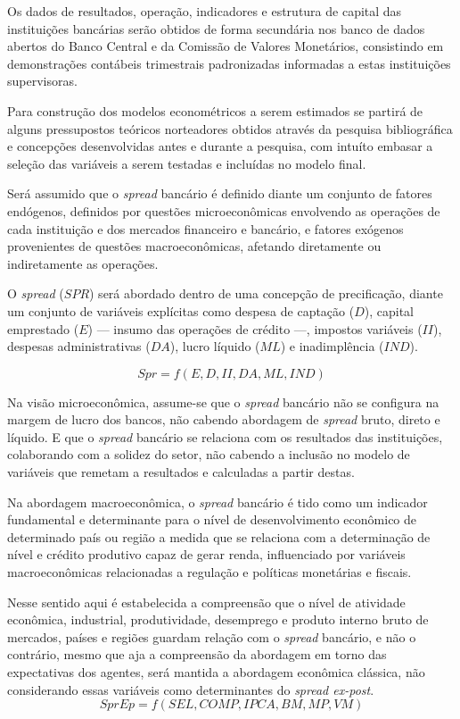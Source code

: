 \documentclass[12pt,12pt,openright,oneside,a4paper,chapter=TITLE,section=TITLE,subsection=TITLE,subsubsection=TITLE,english,french,spanish,portugues,sumario=tradicional]{abntex2}
\begin{document}
Os dados de resultados, operação, indicadores e estrutura de capital das instituições bancárias serão obtidos de forma secundária nos banco de dados abertos do Banco Central e da Comissão de Valores Monetários, consistindo em demonstrações contábeis trimestrais padronizadas informadas a estas instituições supervisoras.

Para construção dos modelos econométricos a serem estimados se partirá de alguns pressupostos teóricos norteadores obtidos através da pesquisa bibliográfica e concepções desenvolvidas antes e durante a pesquisa, com intuíto embasar a seleção das variáveis a serem testadas e incluídas no modelo final.

Será assumido que o \emph{spread} bancário é definido diante um conjunto de fatores endógenos, definidos por questões microeconômicas envolvendo as operações de cada instituição e dos mercados financeiro e bancário, e fatores exógenos provenientes de questões macroeconômicas, afetando diretamente ou indiretamente as operações.

O \emph{spread} (\(SPR\)) será abordado dentro de uma concepção de precificação, diante um conjunto de variáveis explícitas como despesa de captação (\(D\)), capital emprestado (\(E\)) --- insumo das operações de crédito ---, impostos variáveis (\(II\)), despesas administrativas (\(DA\)), lucro líquido (\(ML\)) e inadimplência (\(IND\)).

\[
Spr = f(E,D,II,DA,ML,IND)
\]

Na visão microeconômica, assume-se que o \emph{spread} bancário não se configura na margem de lucro dos bancos, não cabendo abordagem de \emph{spread} bruto, direto e líquido. E que o \emph{spread} bancário se relaciona com os resultados das instituições, colaborando com a solidez do setor, não cabendo a inclusão no modelo de variáveis que remetam a resultados e calculadas a partir destas.

Na abordagem macroeconômica, o \emph{spread} bancário é tido como um indicador fundamental e determinante para o nível de desenvolvimento econômico de determinado país ou região a medida que se relaciona com a determinação de nível e crédito produtivo capaz de gerar renda, influenciado por variáveis macroeconômicas relacionadas a regulação e políticas monetárias e fiscais.

Nesse sentido aqui é estabelecida a compreensão que o nível de atividade econômica, industrial, produtividade, desemprego e produto interno bruto de mercados, países e regiões guardam relação com o \emph{spread} bancário, e não o contrário, mesmo que aja a compreensão da abordagem em torno das expectativas dos agentes, será mantida a abordagem econômica clássica, não considerando essas variáveis como determinantes do \emph{spread ex-post}.
\[
SprEp = f(SEL,COMP,IPCA,BM,MP,VM)
\]
\end{document}
